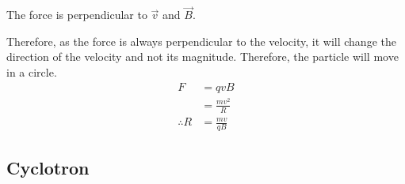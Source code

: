 \documentclass[fleqn, a4paper, 12pt, twoside]{article}
\theoremstyle{definition}
\theoremstyle{theorem}
\begin{document}
\begin{solution}
	The force is perpendicular to $\overrightarrow{v}$ and $\overrightarrow{B}$.
	\begin{figure}[H]
	\end{figure}
	Therefore, as the force is always perpendicular to the velocity, it will change the direction of the velocity and not its magnitude.
	Therefore, the particle will move in a circle.\\
	\begin{align*}
		F            & = q v B           \\
                             & = \frac{m v^2}{R} \\
		\therefore R & = \frac{m v}{q B}
	\end{align*}
\end{solution}

\subsection{Cyclotron}
\end{document}
